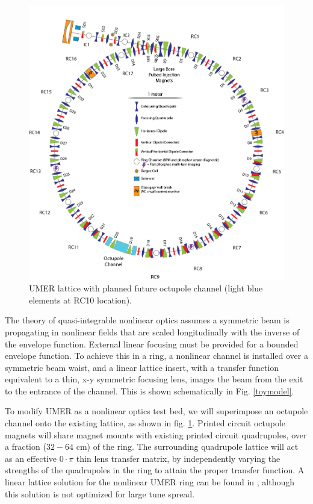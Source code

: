 \begin{figure}[]
\centering
\includegraphics[width=\textwidth]{umer-diagram/full_octu_ring.png}   
\caption{UMER lattice with planned future octupole channel (light blue elements at RC10 location).}
\label{fig:octring}
\end{figure}  


The theory of quasi-integrable nonlinear optics assumes a symmetric beam is propagating in nonlinear fields that are scaled longitudinally with the inverse of the envelope function. External linear focusing must be provided for a bounded envelope function. 
To achieve this in a ring, a nonlinear channel is installed over a symmetric beam waist, and a linear lattice insert,
with a transfer function equivalent to a thin, x-y symmetric focusing lens, images the beam from the exit to the entrance of the channel. This is shown schematically in Fig. \ref{toymodel}.

To modify UMER as a nonlinear optics test bed, we will superimpose an octupole channel onto the existing lattice, as shown in fig. \ref{fig:octring}.
Printed circuit octupole magnets will share magnet mounts with existing printed circuit quadrupoles, over a fraction ($32 - 64$ cm) of the ring. 
The surrounding quadrupole lattice will act as an effective $0 \cdot \pi$ thin lens transfer matrix, by independently varying the strengths of the quadrupoles in the ring to attain the proper transfer function. 
A linear lattice solution for the nonlinear UMER ring can be found in \cite{AAC}, although this solution is not optimized for large tune spread.








